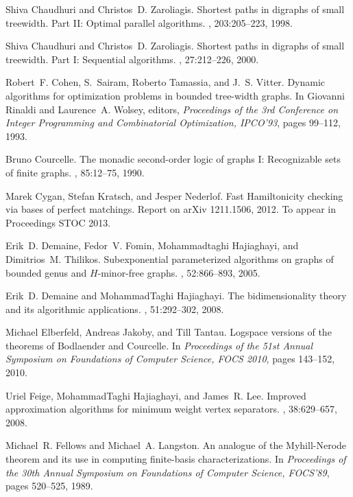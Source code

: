 \documentclass[a4paper,11pt]{article}
\theoremstyle{definition}
\theoremstyle{remark}
\begin{document}
\begin{thebibliography}{10}
Shiva Chaudhuri and Christos~D. Zaroliagis.
\newblock Shortest paths in digraphs of small treewidth. {P}art {II}: {O}ptimal
  parallel algorithms.
, 203:205--223, 1998.

Shiva Chaudhuri and Christos~D. Zaroliagis.
\newblock Shortest paths in digraphs of small treewidth. {P}art {I}:
  {S}equential algorithms.
, 27:212--226, 2000.

Robert~F. Cohen, S.~Sairam, Roberto Tamassia, and J.~S. Vitter.
\newblock Dynamic algorithms for optimization problems in bounded tree-width
  graphs.
\newblock In Giovanni Rinaldi and Laurence~A. Wolsey, editors, {\em Proceedings
  of the 3rd Conference on Integer Programming and Combinatorial Optimization,
  IPCO'93}, pages 99--112, 1993.

Bruno Courcelle.
\newblock The monadic second-order logic of graphs {I}: {R}ecognizable sets of
  finite graphs.
, 85:12--75, 1990.

Marek Cygan, Stefan Kratsch, and Jesper Nederlof.
\newblock Fast {H}amiltonicity checking via bases of perfect matchings.
\newblock Report on arXiv 1211.1506, 2012.
\newblock To appear in Proceedings STOC 2013.

Erik~D. Demaine, Fedor~V. Fomin, Mohammadtaghi Hajiaghayi, and Dimitrios~M.
  Thilikos.
\newblock Subexponential parameterized algorithms on graphs of bounded genus
  and {$H$}-minor-free graphs.
, 52:866--893, 2005.

Erik~D. Demaine and MohammadTaghi Hajiaghayi.
\newblock The bidimensionality theory and its algorithmic applications.
, 51:292--302, 2008.

Michael Elberfeld, Andreas Jakoby, and Till Tantau.
\newblock Logspace versions of the theorems of {B}odlaender and {C}ourcelle.
\newblock In {\em Proceedings of the 51st Annual Symposium on Foundations of
  Computer Science, FOCS 2010}, pages 143--152, 2010.

Uriel Feige, MohammadTaghi Hajiaghayi, and James~R. Lee.
\newblock Improved approximation algorithms for minimum weight vertex
  separators.
, 38:629--657, 2008.

Michael~R. Fellows and Michael~A. Langston.
\newblock An analogue of the {M}yhill-{N}erode theorem and its use in computing
  finite-basis characterizations.
\newblock In {\em Proceedings of the 30th Annual Symposium on Foundations of
  Computer Science, FOCS'89}, pages 520--525, 1989.


\end{thebibliography}
\end{document}
